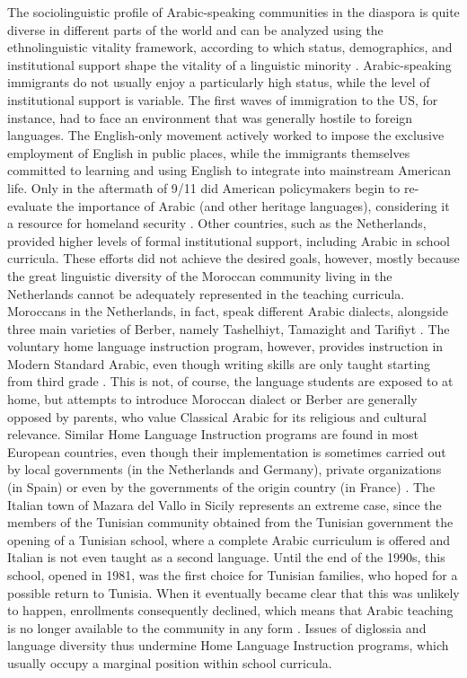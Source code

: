 \documentclass[output=paper]{langsci/langscibook}
\begin{document}
The sociolinguistic profile of Arabic-speaking communities in the diaspora is quite diverse in different parts of the world and can be analyzed using the ethnolinguistic vitality framework, according to which status, demographics, and institutional support shape the vitality of a linguistic minority \citep{GilesTaylor1977,Ehala2015}. Arabic-speaking immigrants do not usually enjoy a particularly high status, while the level of institutional support is variable. The first waves of immigration to the US, for instance, had to face an environment that was generally hostile to foreign languages. The English-only movement actively worked to impose the exclusive employment of English in public places, while the immigrants themselves committed to learning and using English to integrate into mainstream American life. Only in the aftermath of 9/11 did American policymakers begin to re-evaluate the importance of Arabic (and other heritage languages), considering it a resource for homeland security \citep[319--320]{Albirini2016}. Other countries, such as the Netherlands, provided higher levels of formal institutional support, including Arabic in school curricula. These efforts did not achieve the desired goals, however, mostly because the great linguistic diversity of the Moroccan community living in the Netherlands cannot be adequately represented in the teaching curricula. Moroccans in the Netherlands, in fact, speak different Arabic dialects, alongside three main varieties of Berber, namely Tashelhiyt, Tamazight and Tarifiyt \citep[160--161]{ExtraDeRuiter1994}. The voluntary home language instruction program, however, provides instruction in Modern Standard Arabic, even though writing skills are only taught starting from third grade \citep[163--165]{ExtraDeRuiter1994}. This is not, of course, the language students are exposed to at home, but attempts to introduce Moroccan dialect or Berber are generally opposed by parents, who value Classical Arabic for its religious and cultural relevance. Similar Home Language Instruction programs are found in most European countries, even though their implementation is sometimes carried out by local governments (in the Netherlands and Germany), private organizations (in Spain) or even by the governments of the origin country (in France) \citep[264--265]{BoumansdeRuiter2002}. The Italian town of Mazara del Vallo in Sicily represents an extreme case, since the members of the Tunisian community obtained from the Tunisian government the opening of a Tunisian school, where a complete Arabic curriculum is offered and Italian is not even taught as a second language. Until the end of the 1990s, this school, opened in 1981, was the first choice for Tunisian families, who hoped for a possible return to Tunisia. When it eventually became clear that this was unlikely to happen, enrollments consequently declined, which means that Arabic teaching is no longer available to the community in any form \citep[73--77]{Danna2017book}. Issues of diglossia and language diversity thus undermine Home Language Instruction programs, which usually occupy a marginal position within school curricula.
\end{document}
